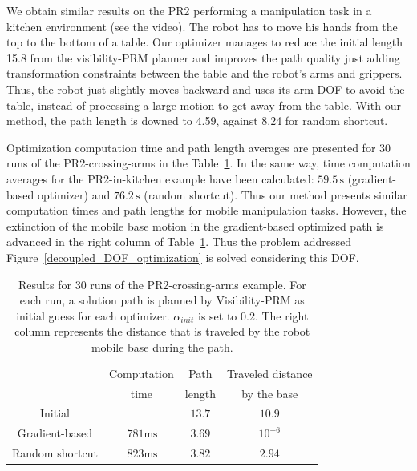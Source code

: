\documentclass{tADR2e}
\begin{document}
We obtain similar results on the PR2 performing a manipulation task 
in a kitchen environment (see the video). The robot has to move 
his hands from the top to the bottom of a table.
Our optimizer manages to reduce the initial length 15.8 from the visibility-PRM 
planner and improves the path quality 
just adding transformation constraints between the table and the 
robot's arms and grippers. Thus, the robot just slightly moves 
backward and uses its arm DOF to avoid the table, instead of 
processing a large motion to get away from the table. With our method, the path length is downed to 4.59, against 8.24 for random shortcut.

Optimization computation time and path length averages are presented for 30 runs of the PR2-crossing-arms in the Table~\ref{tab:results}. In the same way, time computation averages for the PR2-in-kitchen example have been 
calculated: $59.5\,\text{s}$ (gradient-based optimizer) and $76.2\,\text{s}$ (random shortcut).
Thus our method presents 
similar computation times and path lengths for mobile manipulation tasks. However, the extinction of the mobile base motion in the gradient-based optimized path is advanced in the right column of Table~\ref{tab:results}. Thus the problem addressed 
Figure~\ref{decoupled_DOF_optimization} is solved considering this DOF.


\begin{table}[t]
\centering
  \begin{tabular}{cccc}
  \\
  \toprule
     & Computation & Path  & Traveled distance\\
     & time & length & by the base\\
    \midrule
    \midrule
    Initial &  & $13.7$ & $10.9$\\
    Gradient-based & $\,781\text{ms}$ & $3.69$ & $10^{-6}$\\
    Random shortcut & $\,823\text{ms}$ & $3.82$ & $2.94$\\
    \bottomrule
  \end{tabular}
\caption {Results for 30 runs of the PR2-crossing-arms example. For each run, a solution path is planned by Visibility-PRM as initial guess for each optimizer. $\alpha_{init}$ is set to 0.2. The right column represents the distance that is traveled by the robot mobile base during the path.}
\label{tab:results}
\end{table}
\end{document}

